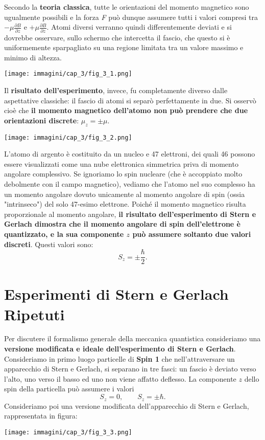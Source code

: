 Secondo la \textbf{teoria classica}, tutte le orientazioni del momento magnetico sono ugualmente possibili e la forza \emph{F} può dunque assumere tutti i valori compresi tra $-\mu \frac{\partial B}{\partial z}$ e $+\mu \frac{\partial B}{\partial z}$. Atomi diversi verranno quindi differentemente deviati e si dovrebbe osservare, sullo schermo che intercetta il fascio, che questo si è uniformemente sparpagliato su una regione limitata tra un valore massimo e minimo di altezza.
\begin{center}
\texttt{[image: immagini/cap\_3/fig\_3\_1.png]}
\end{center}
Il \textbf{risultato dell'esperimento}, invece, fu completamente diverso dalle aspettative classiche: il fascio di atomi si separò perfettamente in due. Si osservò cioè che \textbf{il momento magnetico dell'atomo non può prendere che due orientazioni discrete}: $\mu_z=\pm \mu $.\\
\begin{center}
\texttt{[image: immagini/cap\_3/fig\_3\_2.png]}
\end{center}

L'atomo di argento è costituito da un nucleo e 47 elettroni, dei quali 46 possono essere visualizzati come una nube elettronica simmetrica priva di momento angolare complessivo. Se ignoriamo lo spin nucleare (che è accoppiato molto debolmente con il campo magnetico), vediamo che l'atomo nel suo complesso ha un momento angolare dovuto unicamente al momento angolare di spin (ossia "intrinseco") del solo 47-esimo elettrone. Poiché il momento magnetico risulta proporzionale al momento angolare, \textbf{il risultato dell'esperimento di Stern e Gerlach dimostra che il momento angolare di spin dell'elettrone è quantizzato, e la sua componente $z$ può assumere soltanto due valori discreti}. Questi valori sono:
	\begin{equation}
		\boxed{
			S_z= \pm \frac{\hbar}{2}.
			}
	\end{equation} 
\section{Esperimenti di Stern e Gerlach Ripetuti} 
Per discutere il formalismo generale della meccanica quantistica consideriamo una \textbf{versione modificata e ideale dell'esperimento di Stern e Gerlach}.\\
 
Consideriamo in primo luogo particelle di \textbf{Spin 1} che nell'attraversare un apparecchio di Stern e Gerlach, si separano in tre fasci: un fascio è deviato verso l'alto, uno verso il basso ed uno non viene affatto deflesso. La componente $z$ dello spin della particella può assumere i valori
	\begin{equation}
		S_z=0, \qquad S_z= \pm \hbar .
	\end{equation}
Consideriamo poi una versione modificata dell'apparecchio di Stern e Gerlach, rappresentata in figura: \\
\begin{center}
\texttt{[image: immagini/cap\_3/fig\_3\_3.png]}
\end{center}

